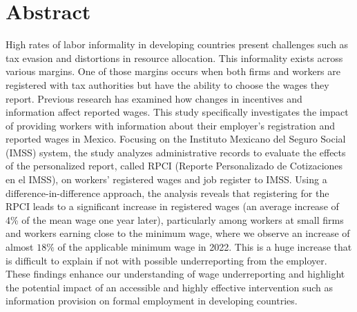 \documentclass[10pt, oneside]{book}
\begin{document}
\pagestyle{plain}

\noindent 


\chapter*{Abstract}

\noindent High rates of labor informality in developing countries present challenges such as tax evasion and distortions in resource allocation. This informality exists across various margins. One of those margins occurs when both firms and workers are registered with tax authorities but have the ability to choose the wages they report. Previous research has examined how changes in incentives and information affect reported wages. This study specifically investigates the impact of providing workers with information about their employer's registration and reported wages in Mexico. Focusing on the Instituto Mexicano del Seguro Social (IMSS) system, the study analyzes administrative records to evaluate the effects of the personalized report, called RPCI (Reporte Personalizado de Cotizaciones en el IMSS), on workers' registered wages and job register to IMSS. Using a difference-in-difference approach, the analysis reveals that registering for the RPCI leads to a significant increase in registered wages (an average increase of 4\% of the mean wage one year later), particularly among workers at small firms and workers earning close to the minimum wage, where we observe an increase of almost $18\%$ of the applicable minimum wage in 2022. This is a huge increase that is difficult to explain if not with possible underreporting from the employer. These findings enhance our understanding of wage underreporting and highlight the potential impact of an accessible and highly effective intervention such as information provision on formal employment in developing countries.

\pagestyle{plain}
\newpage
\noindent 


\tableofcontents

\end{document}
